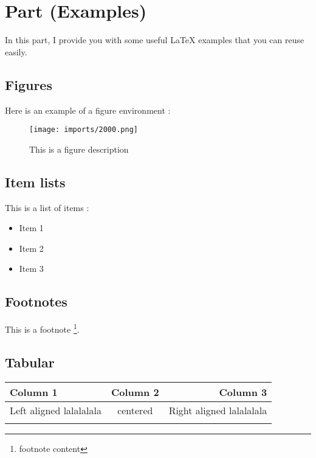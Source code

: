 \section{Part (Examples)}


In this part, I provide you with some useful \LaTeX{} examples that you can reuse easily.

\subsection{Figures}

Here is an example of a figure environment :

\begin{center}
    \begin{figure}[ht!]
        \centering
        
        \texttt{[image: imports/2000.png]}
        
        \caption{This is a figure description}
    \end{figure}
\end{center}

\subsection{Item lists}

This is a list of items :

\begin{itemize}
    \item Item 1
    \item Item 2
    \item Item 3
\end{itemize}

\subsection{Footnotes}

This is a footnote \footnote{footnote content}.

\subsection{Tabular}


\begin{center}
    \begin{tabular}{|l|c|r|} %
        \hline
        \rowcolor{white!75!black} \textbf{Column 1} & \textbf{Column 2} & \textbf{Column 3} \\
        \hline
        Left aligned lalalalala & centered & Right aligned lalalalala\\
        \hline
         & & \\
        \hline
    \end{tabular}
\end{center}
